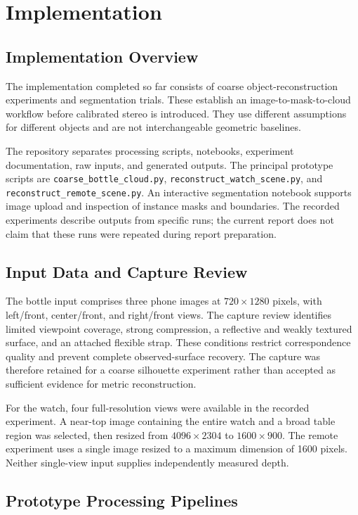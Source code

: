 \chapter{Implementation}
\section{Implementation Overview}
The implementation completed so far consists of coarse object-reconstruction experiments and segmentation trials. These establish an image-to-mask-to-cloud workflow before calibrated stereo is introduced. They use different assumptions for different objects and are not interchangeable geometric baselines.

The repository separates processing scripts, notebooks, experiment documentation, raw inputs, and generated outputs. The principal prototype scripts are \texttt{coarse\_\allowbreak bottle\_\allowbreak cloud.py}, \texttt{reconstruct\_\allowbreak watch\_\allowbreak scene.py}, and \texttt{reconstruct\_\allowbreak remote\_\allowbreak scene.py}. An interactive segmentation notebook supports image upload and inspection of instance masks and boundaries. The recorded experiments describe outputs from specific runs; the current report does not claim that these runs were repeated during report preparation.

\section{Input Data and Capture Review}
The bottle input comprises three phone images at $720\times1280$ pixels, with left/front, center/front, and right/front views. The capture review identifies limited viewpoint coverage, strong compression, a reflective and weakly textured surface, and an attached flexible strap. These conditions restrict correspondence quality and prevent complete observed-surface recovery. The capture was therefore retained for a coarse silhouette experiment rather than accepted as sufficient evidence for metric reconstruction.

For the watch, four full-resolution views were available in the recorded experiment. A near-top image containing the entire watch and a broad table region was selected, then resized from $4096\times2304$ to $1600\times900$. The remote experiment uses a single image resized to a maximum dimension of 1600 pixels. Neither single-view input supplies independently measured depth.

\section{Prototype Processing Pipelines}
